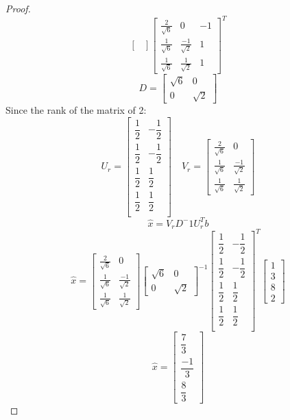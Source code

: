 \documentclass[12pt]{article}
\begin{document}
\begin{proof}
\[\begin{bmatrix}
\end{bmatrix}\begin{bmatrix}
  \frac{2}{\sqrt{6}}&0&-1\\
  \frac{1}{\sqrt{6}}&\frac{-1}{\sqrt{2}}&1\\
  \frac{1}{\sqrt{6}}&\frac{1}{\sqrt{2}}&1
\end{bmatrix}^T
  \]
  \[
    D=\begin{bmatrix}
      \sqrt{6}&0\\0&\sqrt{2}
  \end{bmatrix}
  \]
  Since the rank of the matrix of 2:
  \[
    U_r=\begin{bmatrix}
    \dfrac{1}{2}&-\dfrac{1}{2}\\
      \dfrac{1}{2}&-\dfrac{1}{2}\\
        \dfrac{1}{2}&\dfrac{1}{2}\\
        \dfrac{1}{2}&\dfrac{1}{2}\\
  \end{bmatrix}
  \quad V_r=\begin{bmatrix}
  \frac{2}{\sqrt{6}}&0\\
  \frac{1}{\sqrt{6}}&\frac{-1}{\sqrt{2}}\\
  \frac{1}{\sqrt{6}}&\frac{1}{\sqrt{2}}
\end{bmatrix}
  \]
  \[
    \hat{x}=V_rD^-1U_r^Tb
  \]
  \[
    \hat{x}=\begin{bmatrix}
    \frac{2}{\sqrt{6}}&0\\
    \frac{1}{\sqrt{6}}&\frac{-1}{\sqrt{2}}\\
    \frac{1}{\sqrt{6}}&\frac{1}{\sqrt{2}}
  \end{bmatrix}\begin{bmatrix}
    \sqrt{6}&0\\0&\sqrt{2}
\end{bmatrix}^{-1}\begin{bmatrix}
\dfrac{1}{2}&-\dfrac{1}{2}\\
  \dfrac{1}{2}&-\dfrac{1}{2}\\
    \dfrac{1}{2}&\dfrac{1}{2}\\
    \dfrac{1}{2}&\dfrac{1}{2}\\
\end{bmatrix}^T\begin{bmatrix}
  1\\3\\8\\2
\end{bmatrix}
  \]
  \renewcommand*{\arraystretch}{2}
  \[
    \hat{x}=\begin{bmatrix}
      \dfrac{7}{3}\\\dfrac{-1}{3}\\\dfrac{8}{3}
  \end{bmatrix}
  \]
\end{proof}
\end{document}
